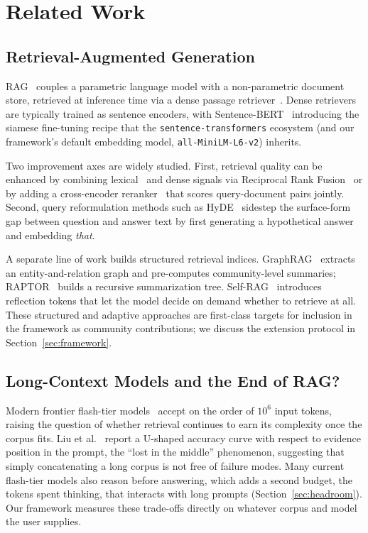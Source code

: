 \documentclass[conference,a4paper,10pt]{IEEEtran}
\begin{document}
\section{Related Work}
\label{sec:related}

\subsection{Retrieval-Augmented Generation}
RAG~\cite{lewis2020rag} couples a parametric language model with a non-parametric document store, retrieved at inference time via a dense passage retriever~\cite{karpukhin2020dpr}.
Dense retrievers are typically trained as sentence encoders, with Sentence-BERT~\cite{reimers2019sbert} introducing the siamese fine-tuning recipe that the \texttt{sentence-transformers} ecosystem (and our framework's default embedding model, \texttt{all-MiniLM-L6-v2}) inherits.

Two improvement axes are widely studied.
First, retrieval quality can be enhanced by combining lexical~\cite{robertson2009bm25} and dense signals via Reciprocal Rank Fusion~\cite{cormack2009rrf} or by adding a cross-encoder reranker~\cite{khattab2020colbert,xiao2023cpack} that scores query-document pairs jointly.
Second, query reformulation methods such as HyDE~\cite{gao2023hyde} sidestep the surface-form gap between question and answer text by first generating a hypothetical answer and embedding \emph{that}.

A separate line of work builds structured retrieval indices.
GraphRAG~\cite{edge2024graphrag} extracts an entity-and-relation graph and pre-computes community-level summaries; RAPTOR~\cite{sarthi2024raptor} builds a recursive summarization tree.
Self-RAG~\cite{asai2024selfrag} introduces reflection tokens that let the model decide on demand whether to retrieve at all.
These structured and adaptive approaches are first-class targets for inclusion in the framework as community contributions; we discuss the extension protocol in Section~\ref{sec:framework}.

\subsection{Long-Context Models and the End of RAG?}
Modern frontier flash-tier models~\cite{gemini2024} accept on the order of $10^6$ input tokens, raising the question of whether retrieval continues to earn its complexity once the corpus fits.
Liu et al.~\cite{liu2024lostmiddle} report a U-shaped accuracy curve with respect to evidence position in the prompt, the ``lost in the middle'' phenomenon, suggesting that simply concatenating a long corpus is not free of failure modes.
Many current flash-tier models also reason before answering, which adds a second budget, the tokens spent thinking, that interacts with long prompts (Section~\ref{sec:headroom}).
Our framework measures these trade-offs directly on whatever corpus and model the user supplies.
\end{document}

